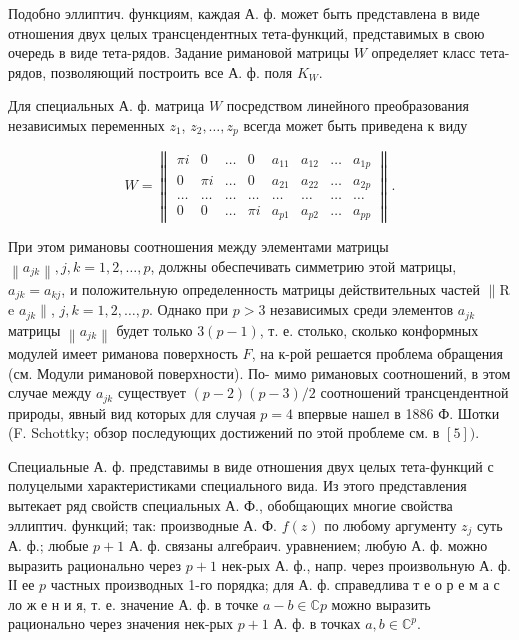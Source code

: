 \documentclass[10pt]{article}
\begin{document}
Подобно эллиптич. функциям, каждая А. ф. может быть представлена в виде отношения двух целых трансцендентных тета-функций, представимых в свою очередь в виде тета-рядов. Задание римановой матрицы $W$ определяет класс тета-рядов, позволяющий построить все А. ф. поля $K_{W}$.



Для специальных А. ф. матрица $W$ посредством линейного преобразования независимых переменных $z_{1}$, $z_{2}, \ldots, z_{p}$ всегда может быть приведена к виду



\[

W=\left\|\begin{array}{cccccccc}

\pi i & 0 & \ldots & 0 & a_{11} & a_{12} & \ldots & a_{1 p} \\

0 & \pi i & \ldots & 0 & a_{21} & a_{22} & \ldots & a_{2 p} \\

\ldots & \ldots & \ldots & \ldots & \ldots & \ldots & \ldots & \ldots \\

0 & 0 & \ldots & \pi i & a_{p 1} & a_{p 2} & \ldots & a_{p p}

\end{array}\right\| .

\]



При этом римановы соотношения между элементами матрицы $\left\|a_{j k}\right\|, j, k=1,2, \ldots, p$, должны обеспечивать симметрию этой матрицы, $a_{j k}=a_{k j}$, и положительную определенность матрицы действительных частей $\| \mathrm{R}$ e $a_{j k} \|$, $j, k=1,2, \ldots, p$. Однако при $p>3$ независимых среди элементов $a_{j k}$ матрицы $\left\|a_{j k}\right\|$ будет только $3(p-1)$, т. е. столько, сколько конформных модулей имеет риманова поверхность $F$, на к-рой решается проблема обращения (см. Модули римановой поверхности). По- мимо римановых соотношений, в этом случае между $a_{j k}$ существует $(p-2)(p-3) / 2$ соотношений трансцендентной природы, явный вид которых для случая $p=4$ впервые нашел в 1886 Ф. Шотки (F. Schottky; обзор последующих достижений по этой проблеме см. в $[5])$.



Специальные А. ф. представимы в виде отношения двух целых тета-функций с полуцелыми характеристиками специального вида. Из этого представления вытекает ряд свойств специальных А. Ф., обобщающих многие свойства эллиптич. функций; так: производные А. Ф. $f(z)$ по любому аргументу $z_{j}$ суть А. ф.; любые $p+1$ А. ф. связаны алгебраич. уравнением; любую А. ф. можно выразить рационально через $p+1$ нек-рых А. ф., напр. через произвольную А. ф. ІІ ее $p$ частных производных 1-го порядка; для А. ф. справедлива т е о р е м а с ло ж е н и я, т. е. значение А. ф. в точке $a-b \in \mathbb{C} p$ можно выразить рационально через значения нек-рых $p+1$ А. ф. в точках $a, b \in \mathbb{C}^{p}$.
\end{document}
